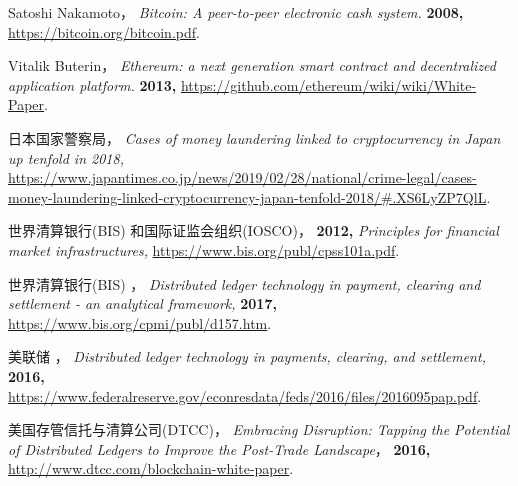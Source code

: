 
\newpage




%

\begin{thebibliography}{99} %

     Satoshi Nakamoto，
    \newblock \textit{Bitcoin: A peer-to-peer electronic cash system.}
    \newblock \textbf{2008,}
    \newblock \url{https://bitcoin.org/bitcoin.pdf}.
        
     Vitalik Buterin，
    \newblock \textit{Ethereum: a next generation smart contract and decentralized application platform.}
    \newblock \textbf{2013,}
    \newblock \url{https://github.com/ethereum/wiki/wiki/White-Paper}.
    
     日本国家警察局，
    \newblock \textit{Cases of money laundering linked to cryptocurrency in Japan up tenfold in 2018,}
    \newblock \url{https://www.japantimes.co.jp/news/2019/02/28/national/crime-legal/cases-money-laundering-linked-cryptocurrency-japan-tenfold-2018/#.XS6LyZP7QlL}.
    
     世界清算银行(BIS) 和国际证监会组织(IOSCO)，
    \newblock \textbf{2012,}
    \newblock \textit{Principles for financial market infrastructures,}
    \newblock \url{https://www.bis.org/publ/cpss101a.pdf}.

     世界清算银行(BIS) ，
    \newblock \textit{Distributed ledger technology in payment, clearing and settlement - an analytical framework,}
    \newblock \textbf{2017,}
    \newblock \url{https://www.bis.org/cpmi/publ/d157.htm}.
    
     美联储 ，
    \newblock \textit{Distributed ledger technology in payments, clearing, and settlement,}
    \newblock \textbf{2016,}
    \newblock \url{https://www.federalreserve.gov/econresdata/feds/2016/files/2016095pap.pdf}.

     美国存管信托与清算公司(DTCC)，
    \newblock \textit{Embracing Disruption: Tapping the Potential of Distributed Ledgers to Improve the Post-Trade Landscape}，
    \newblock \textbf{2016,}
    \newblock \url{http://www.dtcc.com/blockchain-white-paper}.


\end{thebibliography}
